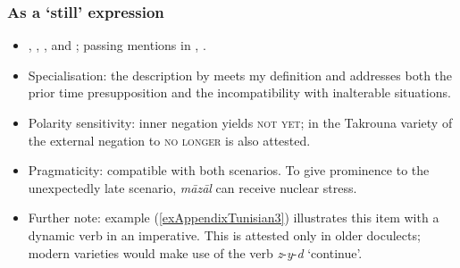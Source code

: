\subsubsection{As a  \lq still\rq{ }expression}
\begin{itemize}
	\item \textcite[221–222]{Amor1990}, \textcite[259]{Boris1958}, \textcite{FischerEtAlTunisian}, \textcite[1735–1742]{MarcaisGuiga19581961} and \textcite[63]{Mion2013}; passing mentions in \textcite[113–114]{Jemni2011}, \textcite[160–161]{Talmoudi1980}.
	\item Specialisation: the description by \citeauthor{FischerEtAlTunisian} meets my definition and addresses both the prior time presupposition and the incompatibility with inalterable situations.
	\item Polarity sensitivity: inner negation yields \textsc{not yet}; in the Takrouna variety of \textcite{MarcaisGuiga19581961} the external negation to \textsc{no longer} is also attested.
	\item Pragmaticity: compatible with both scenarios. To give prominence to the unexpectedly late scenario, \textit{māzāl} can receive nuclear stress.
	\item Further note: example (\ref{exAppendixTunisian3}) illustrates this item with a dynamic verb in an imperative. This is attested only in older doculects; modern varieties would make use of the verb \mbox{\textit{z}-\textit{y}-\textit{d}} \lq continue\rq{}.

\end{itemize}
